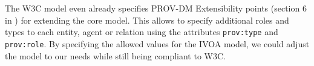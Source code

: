The W3C model even already specifies PROV-DM Extensibility points (section 6 in \cite{std:W3CProvDM}) for extending the core model. This allows to specify additional roles and types to each entity, agent or relation using the attributes \texttt{prov:type} and \texttt{prov:role}.
By specifying the allowed values for the IVOA model, we could adjust the model to our needs while still being compliant to W3C.

